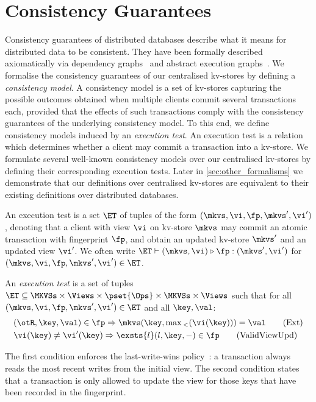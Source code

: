\section{Consistency Guarantees}
\label{sec:cm}
Consistency guarantees of distributed databases describe
what it means for distributed data to be consistent. 
They have been formally described axiomatically via dependency graphs~\cite{adya-icde,adya}
and abstract execution graphs~\cite{ev_transactions,framework-concur}. 
We formalise the consistency guarantees of our centralised kv-stores by defining a 
\emph{consistency model}. 
A consistency model is a set of kv-stores capturing the possible outcomes 
obtained when multiple clients commit several transactions each, 
provided that the effects of such transactions comply with the consistency guarantees of the underlying consistency model. 
To this end, we define consistency models induced by an \emph{execution test}.
An execution test is a relation which determines whether a client may commit a transaction into a kv-store.  
We formulate several well-known consistency models over our centralised kv-stores 
by defining their corresponding execution tests. 
Later in \cref{sec:other_formalisms} we demonstrate that our definitions over centralised kv-stores are equivalent 
to their existing definitions over distributed databases.




An execution test is a set $\ET$ of tuples of the form $(\mkvs, \vi, \fp, \mkvs', \vi')$,
denoting that a client with view $\vi$ on kv-store $\mkvs$  may commit an atomic transaction 
with fingerprint $\fp$, and obtain an updated kv-store \( \mkvs' \) and an updated view $\vi'$. 
We often write
$\ET \vdash (\mkvs, \vi) \triangleright \fp: ( \mkvs', \vi')$ for
$(\mkvs, \vi, \fp, \mkvs', \vi') \in \ET$.


\begin{definition}
\label{def:execution.test}
An \emph{execution test} is a set of tuples $\ET \subseteq \MKVSs \times \Views \times \pset{\Ops} \times \MKVSs \times \Views$ 
such that for all $(\mkvs, \vi, \fp, \mkvs', \vi') \in \ET$ and all $\key, \val$:
%
{%
\begin{align}
\small
    & 
	(\otR, \key, \val) \in \fp \Rightarrow
	\mkvs(\key, \max{}_{<}(\vi(\key))) = \val  
	\tag{Ext} \label{eq:read-external} \\
    & 
    \vi(\key) \neq \vi'(\key) 
    \Rightarrow
    \exsts{l} (l, \key, -) \in \fp
    \tag{ValidViewUpd} \label{eq:valid-view-update}
\end{align}%
}%
\end{definition}
%
\noindent 
The first condition enforces the last-write-wins policy~\cite{vogels:2009:ec:1435417.1435432}: 
a transaction always reads the most recent writes from the initial view.  
The second condition states that a transaction is only allowed to update the view for those keys 
that have been recorded in the fingerprint.  

